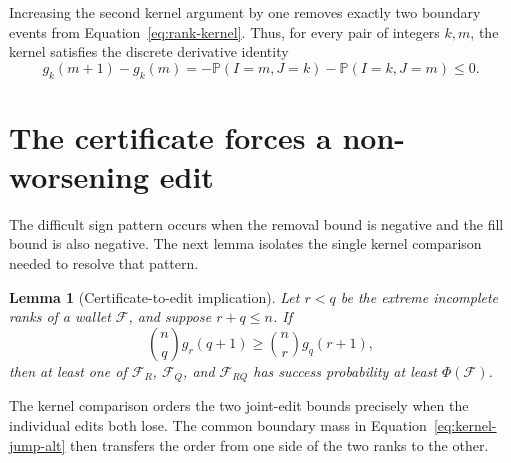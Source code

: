 \documentclass[11pt]{article}
\newtheorem{lemma}[theorem]{Lemma}
\newcommand{\Prob}{\ensuremath{\mathbb P}\xspace}
\newcommand{\cF}{\ensuremath{\mathcal F}\xspace}
\begin{document}
Increasing the second kernel argument by one removes exactly two boundary events from Equation~\eqref{eq:rank-kernel}.
Thus, for every pair of integers $k,m$, the kernel satisfies the discrete derivative identity
\begin{equation}
g_k(m+1)-g_k(m)
=-\Prob(I=m,J=k)-\Prob(I=k,J=m)
\leq0.
\label{eq:kernel-jump-alt}
\end{equation}

  \section{The certificate forces a non-worsening edit}

The difficult sign pattern occurs when the removal bound is negative and the fill bound is also negative.
The next lemma isolates the single kernel comparison needed to resolve that pattern.

\begin{lemma}[Certificate-to-edit implication]\label{lem:certificate-to-edit}
Let ${r<q}$ be the extreme incomplete ranks of a wallet $\cF$, and suppose ${r+q\leq n}$.
If
\begin{equation}
\binom nq g_r(q+1)
\geq
\binom nr g_q(r+1),
\label{eq:assumed-certificate}
\end{equation}
then at least one of $\cF_R$, $\cF_Q$, and $\cF_{RQ}$ has success probability at least $\Phi(\cF)$.
\end{lemma}

The kernel comparison orders the two joint-edit bounds precisely when the individual edits both lose.
The common boundary mass in Equation~\eqref{eq:kernel-jump-alt} then transfers the order from one side of the two ranks to the other.
\end{document}

